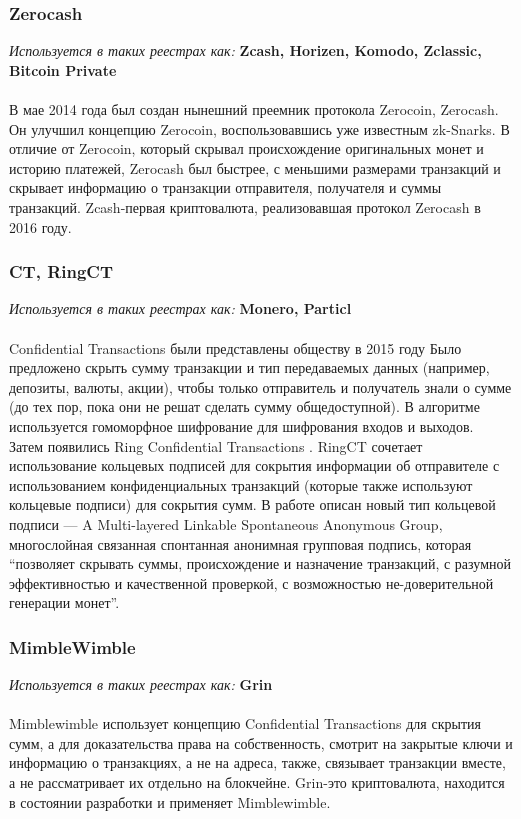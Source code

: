 \subsubsection{Zerocash}
\emph{Используется в таких реестрах как: } \textbf{ Zcash, Horizen, Komodo, Zclassic, Bitcoin Private } \\\\
В мае 2014 года был создан нынешний преемник протокола Zerocoin, Zerocash. Он
улучшил концепцию Zerocoin, воспользовавшись уже известным zk-Snarks. В отличие
от Zerocoin, который скрывал происхождение оригинальных монет и историю
платежей, Zerocash был быстрее, с меньшими размерами транзакций и скрывает
информацию о транзакции отправителя, получателя и суммы транзакций.
Zcash-первая криптовалюта, реализовавшая протокол Zerocash в 2016 году.
\cite{ZerocoinElectricCoinCompany2016}

\subsubsection{CT, RingCT}\label{ringct}
\emph{Используется в таких реестрах как: } \textbf{Monero, Particl} \\\\
Confidential Transactions были представлены обществу в 2015 году \cite{Maxwell}
Было предложено скрыть сумму транзакции и тип передаваемых данных (например,
депозиты, валюты, акции), чтобы только отправитель и получатель знали о сумме
(до тех пор, пока они не решат сделать сумму общедоступной). В алгоритме
используется гомоморфное шифрование для шифрования входов и выходов.\\

Затем появились Ring Confidential Transactions \cite{Noether2016}.  RingCT
сочетает использование кольцевых подписей для сокрытия информации об
отправителе с использованием конфиденциальных транзакций (которые также
используют кольцевые подписи) для сокрытия сумм. В работе описан новый тип
кольцевой подписи --- A Multi-layered Linkable Spontaneous Anonymous Group,
многослойная связанная спонтанная анонимная групповая подпись, которая
``позволяет скрывать суммы, происхождение и назначение транзакций, с разумной
эффективностью и качественной проверкой, с возможностью не-доверительной
генерации монет''.

\subsubsection{MimbleWimble}
\emph{Используется в таких реестрах как: } \textbf{Grin} \\\\
Mimblewimble \cite{Poelstra2016} использует концепцию Confidential Transactions
для скрытия сумм, а для доказательства права на собственность, смотрит на
закрытые ключи и информацию о транзакциях, а не на адреса, также, связывает
транзакции вместе, а не рассматривает их отдельно на блокчейне. Grin-это
криптовалюта, находится в состоянии разработки и применяет Mimblewimble.

